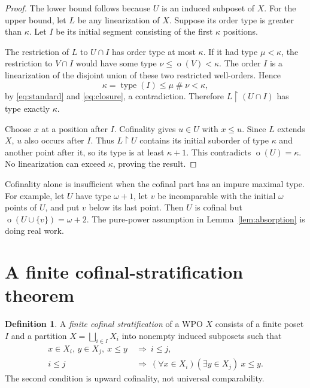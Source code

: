 \documentclass[11pt,a4paper]{article}
\theoremstyle{definition}
\newtheorem{definition}[theorem]{Definition}
\theoremstyle{remark}
\newcommand{\ot}{\operatorname{o}}
\newcommand{\ns}{\mathbin{\#}}
\begin{document}
\begin{proof}
The lower bound follows because $U$ is an induced subposet of $X$.
For the upper bound, let $L$ be any linearization of $X$. Suppose its order
type is greater than $\kappa$. Let $I$ be its initial segment consisting of
the first $\kappa$ positions.

The restriction of $L$ to $U\cap I$ has order type at most $\kappa$.
If it had type $\mu<\kappa$, the restriction to $V\cap I$ would have some
type $\nu\le\ot(V)<\kappa$. The order $I$ is a linearization of the
disjoint union of these two restricted well-orders. Hence
\[
 \kappa=\operatorname{type}(I)\le\mu\ns\nu<\kappa,
\]
by \eqref{eq:standard} and \eqref{eq:closure}, a contradiction. Therefore
$L\upharpoonright(U\cap I)$ has type exactly $\kappa$.

Choose $x$ at a position after $I$. Cofinality gives $u\in U$ with $x\le u$.
Since $L$ extends $X$, $u$ also occurs after $I$. Thus $L\upharpoonright U$
contains its initial suborder of type $\kappa$ and another point after it,
so its type is at least $\kappa+1$. This contradicts $\ot(U)=\kappa$.
No linearization can exceed $\kappa$, proving the result.
\end{proof}

Cofinality alone is insufficient when the cofinal part has an impure
maximal type. For example, let $U$ have type $\omega+1$, let $v$ be
incomparable with the initial $\omega$ points of $U$, and put $v$ below its
last point. Then $U$ is cofinal but $\ot(U\cup\{v\})=\omega+2$.
The pure-power assumption in Lemma~\ref{lem:absorption} is doing real work.

\section{A finite cofinal-stratification theorem}\label{sec:stratification}

\begin{definition}
A \emph{finite cofinal stratification} of a WPO $X$ consists of a finite
poset $I$ and a partition $X=\bigsqcup_{i\in I}X_i$ into nonempty induced
subposets such that
\begin{align}
 x\in X_i,\,y\in X_j,\ x\le y&\ \Longrightarrow\ i\le j,
       \label{eq:indexrespect}\\
 i\le j&\ \Longrightarrow\
 (\forall x\in X_i)(\exists y\in X_j)\ x\le y.
       \label{eq:upcofinal}
\end{align}
The second condition is upward cofinality, not universal comparability.
\end{definition}
\end{document}
